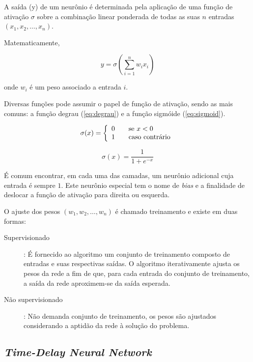 A saída (y) de um neurônio é determinada pela aplicação de uma função de ativação \(\sigma\) sobre a combinação linear ponderada de todas as suas \(n\) entradas \((x_1, x_2, \dots , x_n)\).

Matematicamente,

\[ y = \sigma ( \sum_{i=1}^{n} w_i x_i ) \]

onde \(w_i\) é um peso associado a entrada \(i\).

Diversas funções pode assumir o papel de função de ativação, sendo as mais comuns:
a função degrau (\ref{eq:degrau}) e a função sigmóide (\ref{eq:sigmoid}).

\begin{equation} \label{eq:degrau}
    \sigma (x) = \left\{
    \begin{array}{l l}
        0 & \quad \text{se } x < 0\\
        1 & \quad \text{caso contrário}
    \end{array} \right.
\end{equation}

\begin{equation} \label{eq:sigmoid}
    \sigma (x) = \frac{1}{1 + e^{-x}}
\end{equation}

É comum encontrar, em cada uma das camadas, um neurônio adicional cuja entrada é sempre \(1\). Este neurônio especial tem o nome de \textit{bias} e a finalidade de deslocar a função de ativação para direita ou esquerda.

O ajuste dos pesos \((w_1, w_2, \dots , w_n)\) é chamado treinamento e existe em duas formas:

\begin{description}
    \item[Supervisionado]: É fornecido ao algoritmo um conjunto de treinamento composto de entradas e suas respectivas saídas. O algoritmo iterativamente ajusta os pesos da rede a fim de que, para cada entrada do conjunto de treinamento, a saída da rede aproximem-se da saída esperada.
    \item[Não supervisionado]: Não demanda conjunto de treinamento, os pesos são ajustados considerando a aptidão da rede à solução do problema.
\end{description}

\subsection{\textit{Time-Delay Neural Network}}
\label{sec:tdnn}

